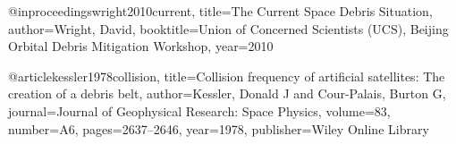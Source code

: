 @inproceedings{wright2010current,
  title={The Current Space Debris Situation},
  author={Wright, David},
  booktitle={Union of Concerned Scientists (UCS), Beijing Orbital Debris Mitigation Workshop},
  year={2010}
}

@article{kessler1978collision,
  title={Collision frequency of artificial satellites: The creation of a debris belt},
  author={Kessler, Donald J and Cour-Palais, Burton G},
  journal={Journal of Geophysical Research: Space Physics},
  volume={83},
  number={A6},
  pages={2637--2646},
  year={1978},
  publisher={Wiley Online Library}
}
